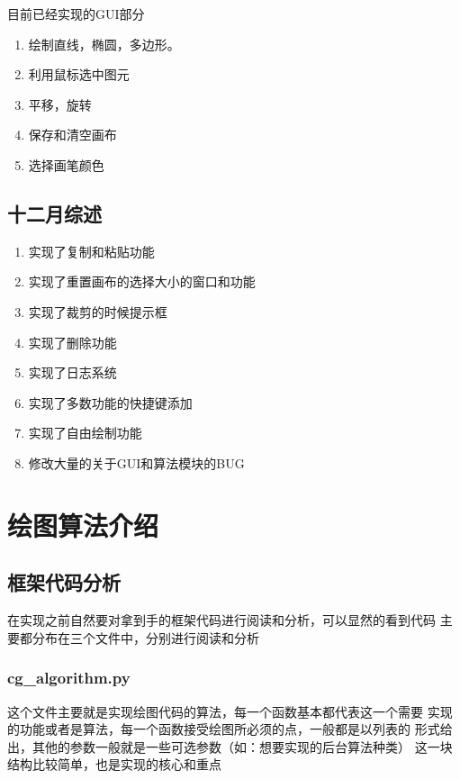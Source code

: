 \documentclass[a4paper,UTF8]{article}
\theoremstyle{definition}
\begin{document}
目前已经实现的GUI部分
\begin{enumerate}
    \item 绘制直线，椭圆，多边形。
    
    \item 利用鼠标选中图元
    
    \item 平移，旋转
    
    \item 保存和清空画布
    
    \item 选择画笔颜色
\end{enumerate}

\subsection{十二月综述}
\begin{enumerate}
    \item 实现了复制和粘贴功能
    \item 实现了重置画布的选择大小的窗口和功能
    \item 实现了裁剪的时候提示框
    \item 实现了删除功能
    \item 实现了日志系统
    \item 实现了多数功能的快捷键添加
    \item 实现了自由绘制功能
    \item 修改大量的关于GUI和算法模块的BUG
\end{enumerate}

\section{绘图算法介绍}
\subsection{框架代码分析}
在实现之前自然要对拿到手的框架代码进行阅读和分析，可以显然的看到代码
主要都分布在三个文件中，分别进行阅读和分析
\subsubsection{cg\_algorithm.py}
这个文件主要就是实现绘图代码的算法，每一个函数基本都代表这一个需要
实现的功能或者是算法，每一个函数接受绘图所必须的点，一般都是以列表的
形式给出，其他的参数一般就是一些可选参数（如：想要实现的后台算法种类）
这一块结构比较简单，也是实现的核心和重点
\end{document}
